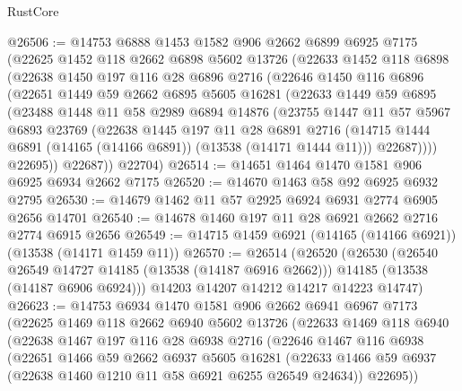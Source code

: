 \begin{lexlean}{RustCore}
\begin{coremodule}
@26506 := @14753
    @6888
    @1453
    @1582
    @906
    @2662
    @6899
    @6925
    @7175
    (@22625
      @1452
      @118
      @2662
      @6898
      @5602
      @13726
      (@22633
        @1452
        @118
        @6898
        (@22638
          @1450
          @197
          @116
          @28
          @6896
          @2716
          (@22646
            @1450
            @116
            @6896
            (@22651
              @1449
              @59
              @2662
              @6895
              @5605
              @16281
              (@22633
                @1449
                @59
                @6895
                (@23488
                  @1448
                  @11
                  @58
                  @2989
                  @6894
                  @14876
                  (@23755
                    @1447
                    @11
                    @57
                    @5967
                    @6893
                    @23769
                    (@22638
                      @1445
                      @197
                      @11
                      @28
                      @6891
                      @2716
                      (@14715 @1444 @6891 (@14165 (@14166 @6891)) (@13538 (@14171 @1444 @11)))
                      @22687))))
              @22695))
          @22687))
      @22704)
@26514 := @14651 @1464 @1470 @1581 @906 @6925 @6934 @2662 @7175
@26520 := @14670 @1463 @58 @92 @6925 @6932 @2795
@26530 := @14679 @1462 @11 @57 @2925 @6924 @6931 @2774 @6905 @2656 @14701
@26540 := @14678 @1460 @197 @11 @28 @6921 @2662 @2716 @2774 @6915 @2656
@26549 := @14715 @1459 @6921 (@14165 (@14166 @6921)) (@13538 (@14171 @1459 @11))
@26570 := @26514
    (@26520
      (@26530
        (@26540 @26549 @14727 @14185 (@13538 (@14187 @6916 @2662)))
        @14185
        (@13538 (@14187 @6906 @6924)))
      @14203
      @14207
      @14212
      @14217
      @14223
      @14747)
@26623 := @14753
    @6934
    @1470
    @1581
    @906
    @2662
    @6941
    @6967
    @7173
    (@22625
      @1469
      @118
      @2662
      @6940
      @5602
      @13726
      (@22633
        @1469
        @118
        @6940
        (@22638
          @1467
          @197
          @116
          @28
          @6938
          @2716
          (@22646
            @1467
            @116
            @6938
            (@22651
              @1466
              @59
              @2662
              @6937
              @5605
              @16281
              (@22633 @1466 @59 @6937 (@22638 @1460 @1210 @11 @58 @6921 @6255 @26549 @24634))
              @22695))

\end{coremodule}
\end{lexlean}
